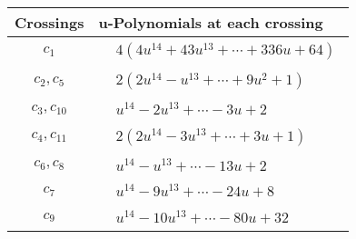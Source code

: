\documentclass[1p]{elsarticle_modified}
\theoremstyle{definition}
\begin{document}
\begin{tabular}{m{50pt}|m{274pt}}
Crossings & \hspace{64pt}u-Polynomials at each crossing \\
\hline $$\begin{aligned}c_{1}\end{aligned}$$&$\begin{aligned}
&4(4 u^{14}+43 u^{13}+\cdots+336 u+64)
\end{aligned}$\\
\hline $$\begin{aligned}c_{2},c_{5}\end{aligned}$$&$\begin{aligned}
&2(2 u^{14}- u^{13}+\cdots+9 u^2+1)
\end{aligned}$\\
\hline $$\begin{aligned}c_{3},c_{10}\end{aligned}$$&$\begin{aligned}
&u^{14}-2 u^{13}+\cdots-3 u+2
\end{aligned}$\\
\hline $$\begin{aligned}c_{4},c_{11}\end{aligned}$$&$\begin{aligned}
&2(2 u^{14}-3 u^{13}+\cdots+3 u+1)
\end{aligned}$\\
\hline $$\begin{aligned}c_{6},c_{8}\end{aligned}$$&$\begin{aligned}
&u^{14}- u^{13}+\cdots-13 u+2
\end{aligned}$\\
\hline $$\begin{aligned}c_{7}\end{aligned}$$&$\begin{aligned}
&u^{14}-9 u^{13}+\cdots-24 u+8
\end{aligned}$\\
\hline $$\begin{aligned}c_{9}\end{aligned}$$&$\begin{aligned}
&u^{14}-10 u^{13}+\cdots-80 u+32
\end{aligned}$\\
\hline
\end{tabular}\\~\\
\newpage\renewcommand{\arraystretch}{1}
\end{document}
